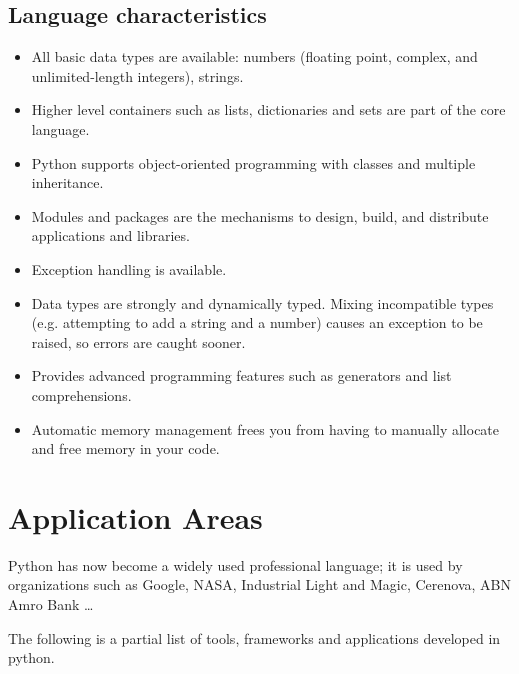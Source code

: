 \documentclass[11pt,a4paper]{article}
\begin{document}
\subsection*{Language characteristics}
    \begin{itemize}
        \item All basic data types are available: numbers (floating point, complex, and unlimited-length integers), strings.
        \item Higher level containers such as  lists, dictionaries and sets are part of the core language.
        \item Python supports object-oriented programming with classes and multiple inheritance.
        \item Modules and packages are the mechanisms to design, build, and distribute applications and libraries.
        \item Exception handling is available. 
        \item Data types are strongly and dynamically typed. Mixing incompatible types (e.g. attempting to add a string and a number) causes an exception to be raised, so errors are caught sooner.
        \item Provides advanced programming features such as generators and list comprehensions.
        \item Automatic memory management frees you from having to manually allocate and free memory in your code.
    \end{itemize}

    \section*{Application Areas}
    Python has now become a widely used professional language; it is used by organizations such as Google, NASA, Industrial Light and Magic, Cerenova, ABN Amro Bank \ldots

    The following is a partial list of tools, frameworks and applications developed in python.
\end{document}
